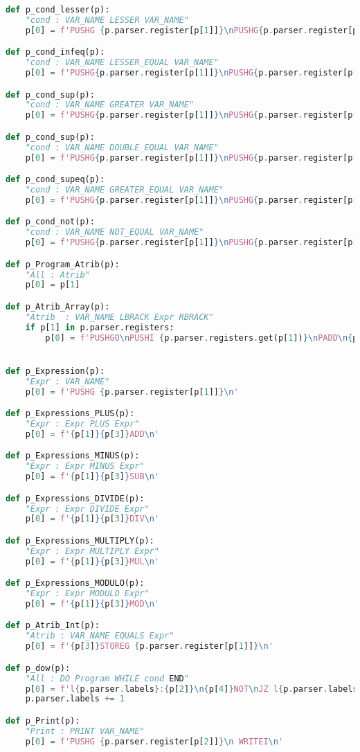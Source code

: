 \documentclass[11pt,a4paper]{report}
\begin{document}
\begin{lstlisting}[language=python,firstnumber=1]
def p_cond_lesser(p):
    "cond : VAR_NAME LESSER VAR_NAME"
    p[0] = f'PUSHG {p.parser.register[p[1]]}\nPUSHG{p.parser.register[p[3]]}\n INF\n'

def p_cond_infeq(p):
    "cond : VAR_NAME LESSER_EQUAL VAR_NAME"
    p[0] = f'PUSHG{p.parser.register[p[1]]}\nPUSHG{p.parser.register[p[2]]}\n INFEQ\n' 

def p_cond_sup(p):
    "cond : VAR_NAME GREATER VAR_NAME"
    p[0] = f'PUSHG{p.parser.register[p[1]]}\nPUSHG{p.parser.register[p[2]]}\n SUP\n'  

def p_cond_sup(p):
    "cond : VAR_NAME DOUBLE_EQUAL VAR_NAME"
    p[0] = f'PUSHG{p.parser.register[p[1]]}\nPUSHG{p.parser.register[p[2]]}\n EQUAL\n'

def p_cond_supeq(p):
    "cond : VAR_NAME GREATER_EQUAL VAR_NAME"
    p[0] = f'PUSHG{p.parser.register[p[1]]}\nPUSHG{p.parser.register[p[2]]}\n SUFEQ\n' 

def p_cond_not(p):
    "cond : VAR_NAME NOT_EQUAL VAR_NAME"
    p[0] = f'PUSHG{p.parser.register[p[1]]}\nPUSHG{p.parser.register[p[2]]}\n NOT\n' 

def p_Program_Atrib(p):
    "All : Atrib"
    p[0] = p[1]

def p_Atrib_Array(p):
    "Atrib  : VAR_NAME LBRACK Expr RBRACK"
    if p[1] in p.parser.registers:
        p[0] = f'PUSHGO\nPUSHI {p.parser.registers.get(p[1])}\nPADD\n{p[3]}STOREN\n'


def p_Expression(p):
    "Expr : VAR_NAME"
    p[0] = f'PUSHG {p.parser.register[p[1]]}\n'

def p_Expressions_PLUS(p):
    "Expr : Expr PLUS Expr"
    p[0] = f'{p[1]}{p[3]}ADD\n'

def p_Expressions_MINUS(p):
    "Expr : Expr MINUS Expr"
    p[0] = f'{p[1]}{p[3]}SUB\n'

def p_Expressions_DIVIDE(p):
    "Expr : Expr DIVIDE Expr"
    p[0] = f'{p[1]}{p[3]}DIV\n'

def p_Expressions_MULTIPLY(p):
    "Expr : Expr MULTIPLY Expr"
    p[0] = f'{p[1]}{p[3]}MUL\n'

def p_Expressions_MODULO(p):
    "Expr : Expr MODULO Expr"
    p[0] = f'{p[1]}{p[3]}MOD\n'

def p_Atrib_Int(p):
    "Atrib : VAR_NAME EQUALS Expr"
    p[0] = f'{p[3]}STOREG {p.parser.register[p[1]]}\n'

def p_dow(p):
    "All : DO Program WHILE cond END"
    p[0] = f'l{p.parser.labels}:{p[2]}\n{p[4]}NOT\nJZ l{p.parser.labels}'
    p.parser.labels += 1

def p_Print(p):
    "Print : PRINT VAR_NAME"
    p[0] = f'PUSHG {p.parser.register[p[2]]}\n WRITEI\n'


\end{lstlisting}
\end{document}
